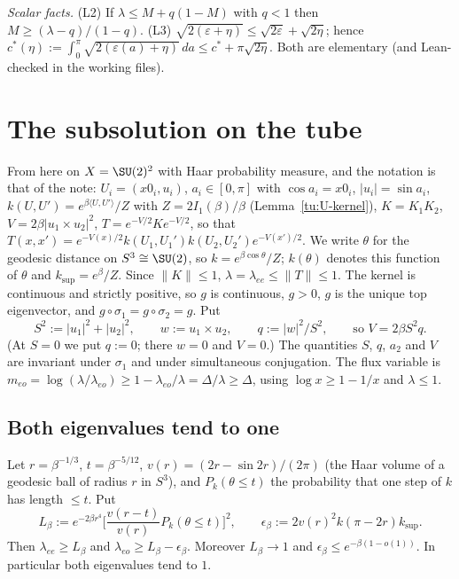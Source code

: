 \noindent\emph{Scalar facts.} (L2) If $\lambda\le M+q(1-M)$ with $q<1$ then $M\ge(\lambda-q)/(1-q)$.
(L3) $\sqrt{2(\varepsilon+\eta)}\le\sqrt{2\varepsilon}+\sqrt{2\eta}$; hence
$c^*(\eta):=\int_0^\pi\sqrt{2(\varepsilon(a)+\eta)}\,da\le c^*+\pi\sqrt{2\eta}$. Both are elementary
(and Lean-checked in the working files).

\section{The subsolution on the tube}\label{tu:L-sec-sub}

From here on $X=\SU(2)^2$ with Haar probability measure, and the notation is that of the note:
$U_i=(x0_i,u_i)$, $a_i\in[0,\pi]$ with $\cos a_i=x0_i$, $|u_i|=\sin a_i$,
$k(U,U')=e^{\beta\langle U,U'\rangle}/Z$ with $Z=2I_1(\beta)/\beta$ (Lemma~\ref{tu:U-kernel}),
$K=K_1K_2$, $V=2\beta|u_1\times u_2|^2$, $T=e^{-V/2}Ke^{-V/2}$, so that
$T(x,x')=e^{-V(x)/2}k(U_1,U_1')k(U_2,U_2')e^{-V(x')/2}$. We write $\theta$ for the geodesic distance
on $S^3\cong\SU(2)$, so $k=e^{\beta\cos\theta}/Z$; $k(\theta)$ denotes this function of $\theta$ and
$k_{\sup}=e^\beta/Z$. Since $\|K\|\le1$, $\lambda=\lambda_{ee}\le\|T\|\le1$. The kernel is continuous
and strictly positive, so $g$ is continuous, $g>0$, $g$ is the unique top eigenvector, and
$g\circ\sigma_1=g\circ\sigma_2=g$. Put
\[
S^2:=|u_1|^2+|u_2|^2,\qquad w:=u_1\times u_2,\qquad q:=|w|^2/S^2,\qquad\text{so } V=2\beta S^2q .
\]
(At $S=0$ we put $q:=0$; there $w=0$ and $V=0$.)
The quantities $S$, $q$, $a_2$ and $V$ are invariant under $\sigma_1$ and under simultaneous
conjugation. The flux variable is $m_{eo}=\log(\lambda/\lambda_{eo})\ge1-\lambda_{eo}/\lambda=\Delta/\lambda\ge\Delta$,
using $\log x\ge1-1/x$ and $\lambda\le1$.

\subsection{Both eigenvalues tend to one}

\begin{lemma}[L4]\label{tu:L-L4}
Let $r=\beta^{-1/3}$, $t=\beta^{-5/12}$, $v(r)=(2r-\sin2r)/(2\pi)$ (the Haar volume of a geodesic
ball of radius $r$ in $S^3$), and $P_k(\theta\le t)$ the probability that one step of $k$ has
length $\le t$. Put
\[
L_\beta:=e^{-2\beta r^4}\Big[\frac{v(r-t)}{v(r)}P_k(\theta\le t)\Big]^2,\qquad
\epsilon_\beta:=2v(r)^2k(\pi-2r)k_{\sup}.
\]
Then $\lambda_{ee}\ge L_\beta$ and $\lambda_{eo}\ge L_\beta-\epsilon_\beta$. Moreover $L_\beta\to1$ and
$\epsilon_\beta\le e^{-\beta(1-o(1))}$. In particular both eigenvalues tend to $1$.
\end{lemma}

